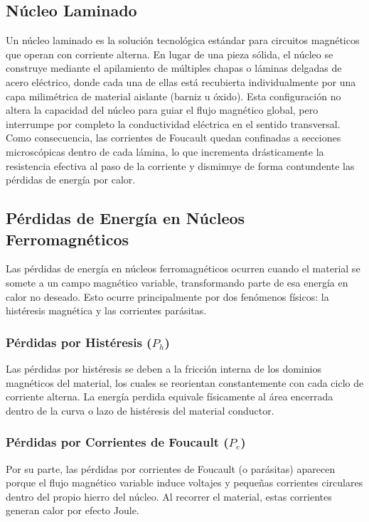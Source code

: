 \subsection{Núcleo Laminado}
Un núcleo laminado es la solución tecnológica estándar para circuitos magnéticos que operan con corriente alterna. En lugar de una pieza sólida, el núcleo se construye mediante el apilamiento de múltiples chapas o láminas delgadas de acero eléctrico, donde cada una de ellas está recubierta individualmente por una capa milimétrica de material aislante (barniz u óxido). Esta configuración no altera la capacidad del núcleo para guiar el flujo magnético global, pero interrumpe por completo la conductividad eléctrica en el sentido transversal. Como consecuencia, las corrientes de Foucault quedan confinadas a secciones microscópicas dentro de cada lámina, lo que incrementa drásticamente la resistencia efectiva al paso de la corriente y disminuye de forma contundente las pérdidas de energía por calor.

\subsection{Pérdidas de Energía en Núcleos Ferromagnéticos}

Las pérdidas de energía en núcleos ferromagnéticos ocurren cuando el material se somete a un campo magnético variable, transformando parte de esa energía en calor no deseado. Esto ocurre principalmente por dos fenómenos físicos: la histéresis magnética y las corrientes parásitas.

\subsubsection{Pérdidas por Histéresis ($P_h$)}
Las pérdidas por histéresis se deben a la fricción interna de los dominios magnéticos del material, los cuales se reorientan constantemente con cada ciclo de corriente alterna. La energía perdida equivale físicamente al área encerrada dentro de la curva o lazo de histéresis del material conductor.

\subsubsection{Pérdidas por Corrientes de Foucault ($P_e$)}
Por su parte, las pérdidas por corrientes de Foucault (o parásitas) aparecen porque el flujo magnético variable induce voltajes y pequeñas corrientes circulares dentro del propio hierro del núcleo. Al recorrer el material, estas corrientes generan calor por efecto Joule.

